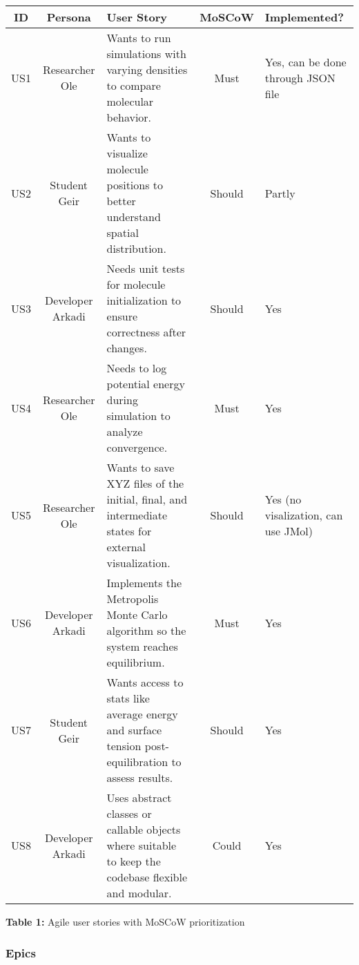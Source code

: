 \documentclass{article}
\begin{document}
\begin{center}
\renewcommand{\arraystretch}{1.4}
\begin{tabularx}{\textwidth}{|c|c|X|c|X|}
\hline
\textbf{ID} & \textbf{Persona} & \textbf{User Story} & \textbf{MoSCoW} & \textbf{Implemented?}\\
\hline
US1 & Researcher Ole & Wants to run simulations with varying densities to compare molecular behavior. & Must & Yes, can be done through JSON file\\
US2 & Student Geir & Wants to visualize molecule positions to better understand spatial distribution. & Should & Partly \\
US3 & Developer Arkadi & Needs unit tests for molecule initialization to ensure correctness after changes. & Should & Yes\\
US4 & Researcher Ole & Needs to log potential energy during simulation to analyze convergence. & Must & Yes\\
US5 & Researcher Ole & Wants to save XYZ files of the initial, final, and intermediate states for external visualization. & Should & Yes (no visalization, can use JMol) \\
US6 & Developer Arkadi & Implements the Metropolis Monte Carlo algorithm so the system reaches equilibrium. & Must &  Yes\\
US7 & Student Geir & Wants access to stats like average energy and surface tension post-equilibration to assess results. & Should & Yes \\
US8 & Developer Arkadi & Uses abstract classes or callable objects where suitable to keep the codebase flexible and modular. & Could & Yes\\
\hline
\end{tabularx}

\vspace{0.5em}
\textbf{Table 1:} Agile user stories with MoSCoW prioritization
\end{center}


\subsubsection*{Epics}
\end{document}
